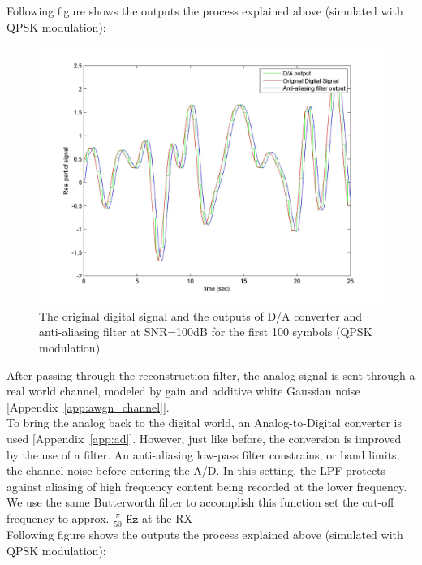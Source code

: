 \documentclass[]{article}
\begin{document}
\newpage
Following figure shows the outputs the process explained above (simulated with QPSK modulation):

\begin{figure}[H]
\centering
\includegraphics[width=\textwidth]{DtoA.jpg}
\caption{The original digital signal and the outputs of D/A converter and anti-aliasing filter at SNR=100dB for the first 100 symbols (QPSK modulation)\label{fig:dtoa}}
\end{figure}

After passing through the reconstruction filter, the analog signal is  sent through a real world channel, modeled by gain and additive white Gaussian noise [Appendix~\ref{app:awgn_channel}].\\


To bring the analog back to the digital world, an Analog-to-Digital converter is used [Appendix~\ref{app:ad}].  However, just like before, the conversion is improved by the use of a filter.  An anti-aliasing low-pass filter constrains, or band limits, the channel noise before entering the A/D.  In this setting, the LPF protects against aliasing of high frequency content being recorded at the lower frequency.  We use the same Butterworth filter to accomplish this function set the cut-off frequency to approx. $\frac{\pi}{50}$ $\mathtt{Hz}$ at the RX \\

\newpage
Following figure shows the outputs the process explained above (simulated with QPSK modulation):
\end{document}
